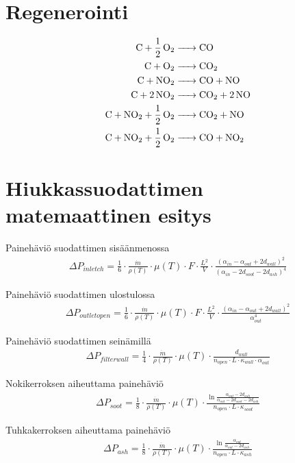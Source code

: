 \section{Regenerointi}
\begin{align*}
    \ce{C + 1/2 O2 &-> CO }\\
    \ce{C + O2 &-> CO2}\\
    \ce{C + NO2 &-> CO +  NO}  \\
    \ce{C + 2 NO2 &-> CO2 + 2 NO}  \\
    \ce{C + NO2 + 1/2 O2 &-> CO2 + NO}  \\
    \ce{C + NO2 + 1/2 O2 &-> CO + NO2} 
\end{align*}
\cite{LiuGuanlin2021Roio}


\section{Hiukkassuodattimen matemaattinen esitys}

\begin{figure}[H]
    \centering 
    
    \caption{}
    \label{fig:blocks1}
\end{figure}

Painehäviö suodattimen sisäänmenossa
\begin{align}
    \Delta P_{inletch} = \frac{1}{6} \cdot
    \frac{\dot{m}}{\rho(T)} \cdot \mu(T) 
    \cdot F \cdot \frac{L^2}{V} \cdot \frac{(\alpha_{in}-\alpha_{out}+2 d_{wall})^2}{(\alpha_{in}-2d_{soot}-2d_{ash})^4}
    \label{eq:PDinletchannel}
\end{align}

Painehäviö suodattimen ulostulossa 
\begin{align}
    \Delta P_{outletopen} = \frac{1}{6} \cdot
    \frac{\dot{m}}{\rho(T)} \cdot \mu(T) 
    \cdot F \cdot \frac{L^2}{V} \cdot \frac{(\alpha_{in}-\alpha_{out}+2 d_{wall})^2}{\alpha_{out}^4}
    \label{eq:PDoutletopen}
\end{align}

Painehäviö suodattimen seinämillä
\begin{align}
    \Delta P_{filterwall} = \frac{1}{4} \cdot
    \frac{\dot{m}}{\rho(T)} \cdot \mu(T) 
    \cdot \frac{d_{wall}}
    {n_{open}\cdot L \cdot \kappa_{wall} \cdot \alpha_{out}}
    \label{eq:PDfilterwall}
\end{align}

Nokikerroksen aiheuttama painehäviö
\begin{align}
    \Delta P_{soot} =  \frac{1}{8} \cdot
    \frac{\dot{m}}{\rho(T)} \cdot \mu(T) \cdot 
    \frac{\ln{\frac{\alpha_{out}-2d_{ash}}{\alpha_{out}-2d_{soot}-2d_{ash}}}}
    {n_{open}\cdot L \cdot \kappa_{soot}}
    \label{eq:PDsootlayer}
\end{align}

Tuhkakerroksen aiheuttama painehäviö
\begin{align}
    \Delta P_{ash} = \frac{1}{8} \cdot
    \frac{\dot{m}}{\rho(T)} \cdot \mu(T) \cdot 
    \frac{\ln{\frac{\alpha_{out}}{\alpha_{out}-2d_{ash}}}}
    {n_{open}\cdot L \cdot \kappa_{ash}}
    \label{eq:PDashlayer}
\end{align}